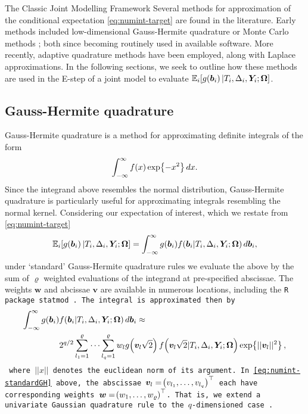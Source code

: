 \begin{chapter}{\label{cha:methods-classic}The Classic Joint Modelling Framework}
Several methods for approximation of the conditional expectation \eqref{eq:numint-target} are found in the literature. Early methods included low-dimensional Gauss-Hermite quadrature or Monte Carlo methods \citep{Wulfsohn97, Henderson2000}; both since becoming routinely used in available software. More recently, adaptive quadrature methods have been employed, along with Laplace approximations. In the following sections, we seek to outline how these methods are used in the E-step of a joint model to evaluate $\mathbb{E}_i\!\left[ g\!\left(\bm{b}_i\right)|T_i, \Delta_i, \bm{Y}_i; \bm{\mathrm{\Omega}}\right]$.
\subsection{Gauss-Hermite quadrature}\label{sec:numint-GH}
Gauss-Hermite quadrature is a method for approximating definite integrals of the form
\begin{equation*}
  \int_{-\infty}^\infty f(x)\exp\!\left\{-x^2\right\} dx.
\end{equation*}
Since the integrand above resembles the normal distribution, Gauss-Hermite quadrature is particularly useful for approximating integrals resembling the normal kernel. Considering our expectation of interest, which we restate from \eqref{eq:numint-target}
\begin{align*}
    \mathbb{E}_i\!\left[ g\!\left(\bm{b}_i\right)|T_i, \Delta_i, \bm{Y}_i; \bm{\mathrm{\Omega}}\right]=\int_{-\infty}^\infty g(\bm{b}_i) f\!\left(\bm{b}_i|T_i,\Delta_i, \bm{Y}_i;\bm{\mathrm{\Omega}}\right) d\bm{b}_i,
\end{align*}
under `standard' Gauss-Hermite quadrature rules we evaluate the above by the sum of $\varrho$ weighted evaluations of the integrand at pre-specified abscissae. The weights $\bm{w}$ and abcissae $\bm{v}$ are available in numerous locations, including the \tt{R} package \tt{statmod} \citep{quadrature}. The integral is approximated then by
\begin{align}
    \int_{-\infty}^\infty g\!\left(\bm{b}_i\right) &f\!\left(\bm{b}_i|T_i,\Delta_i,\bm{Y}_i;\bm{\mathrm{\Omega}}\right) d\bm{b}_i \approx \nonumber\\
    & 2^{q/2}\sum_{l_1=1}^\varrho\dots\sum_{l_q=1}^\varrho w_l g\!\left( \bm{v}_l\sqrt{2}\right) f\!\left( \bm{v}_l\sqrt{2}|T_i,\Delta_i,\bm{Y}_i;\bm{\mathrm{\Omega}}\right)\exp\!\left\{||\bm{v}_l||^2\right\},
\label{eq:numint-standardGH}
\end{align}
where $||x||$ denotes the euclidean norm of its argument. In \eqref{eq:numint-standardGH} above, the abscissae $\bm{v}_l=\!\left( v_{l_1}, \dots, v_{l_q}\right)^\top$ each have corresponding weights $\bm{w}=\!\left( w_1,\dots,w_\varrho\right)^\top$. That is, we extend a univariate Gaussian quadrature rule to the $q$-dimensioned case \citep{RizopoulosJMbook}.


\end{chapter}
